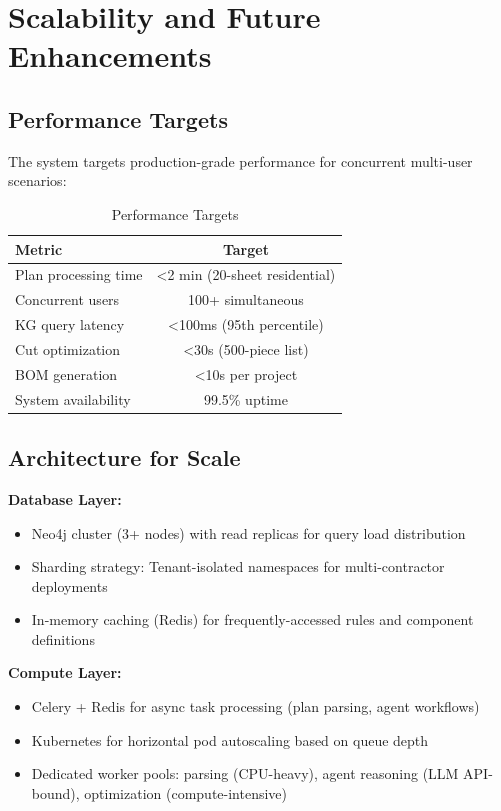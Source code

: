 
\section{Scalability and Future Enhancements}

\subsection{Performance Targets}

The system targets production-grade performance for concurrent multi-user scenarios:

\begin{table}[ht]
\centering
\caption{Performance Targets}
\label{tab:perf_targets}
\begin{tabular}{lc}
\toprule
\textbf{Metric} & \textbf{Target} \\
\midrule
Plan processing time & <2 min (20-sheet residential) \\
Concurrent users & 100+ simultaneous \\
KG query latency & <100ms (95th percentile) \\
Cut optimization & <30s (500-piece list) \\
BOM generation & <10s per project \\
System availability & 99.5\% uptime \\
\bottomrule
\end{tabular}
\end{table}

\subsection{Architecture for Scale}

\textbf{Database Layer:}
\begin{itemize}
  \item Neo4j cluster (3+ nodes) with read replicas for query load distribution
  \item Sharding strategy: Tenant-isolated namespaces for multi-contractor deployments
  \item In-memory caching (Redis) for frequently-accessed rules and component definitions
\end{itemize}

\textbf{Compute Layer:}
\begin{itemize}
  \item Celery + Redis for async task processing (plan parsing, agent workflows)
  \item Kubernetes for horizontal pod autoscaling based on queue depth
  \item Dedicated worker pools: parsing (CPU-heavy), agent reasoning (LLM API-bound), optimization (compute-intensive)
\end{itemize}

